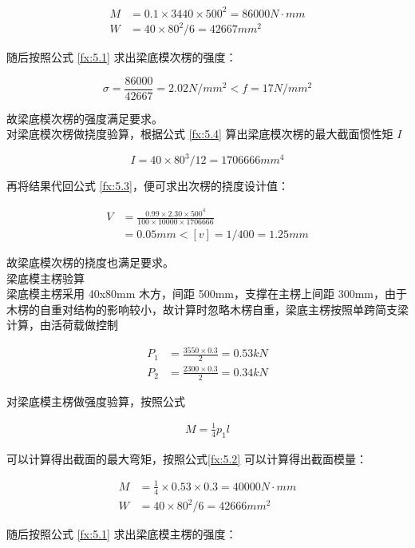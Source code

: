 \begin{align*}
    M&=0.1\times 3440\times 500^2=86000 N \cdot mm\\
    W&=40\times 80^2 /6=42667 mm^2
\end{align*}

随后按照公式 \ref{fx:5.1} 求出梁底模次楞的强度：

\[
    \sigma = \frac{86000}{42667}=2.02 N/mm^2< f=17N/mm^2
\]

故梁底模次楞的强度满足要求。\\

对梁底模次楞做挠度验算，根据公式 \ref{fx:5.4} 算出梁底模次楞的最大截面惯性矩 $I$

\[
    I=40\times 80^3 /12=1706666 mm^4
\]

再将结果代回公式 \ref{fx:5.3}，便可求出次楞的挠度设计值：

\begin{align*}
    V&=\frac{0.99\times 2.30 \times 500^4}{100\times 10000\times 1706666}\\
    &=0.05 mm<[v]=1/400=1.25mm
\end{align*}

故梁底模次楞的挠度也满足要求。\\

 梁底模主楞验算\\

梁底模主楞采用 40x80mm 木方，间距 500mm，支撑在主楞上间距 300mm，由于木楞的自重对结构的影响较小，故计算时忽略木楞自重，梁底主楞按照单跨简支梁计算，由活荷载做控制

\begin{align*}
    P_1&=\frac{3550\times 0.3}{2}=0.53 kN\\
    P_2&=\frac{2300\times 0.3}{2}=0.34 kN
\end{align*}

对梁底模主楞做强度验算，按照公式

\begin{align}
    \label{fx:5.A}
    M=\frac{1}{4}p_1l
\end{align}

可以计算得出截面的最大弯矩，按照公式\ref{fx:5.2} 可以计算得出截面模量：

\begin{align*}
    M&=\frac{1}{4}\times 0.53\times 0.3=40000 N \cdot mm\\
    W&=40\times 80^2 /6=42666 mm^2
\end{align*}

随后按照公式 \ref{fx:5.1} 求出梁底模主楞的强度：

